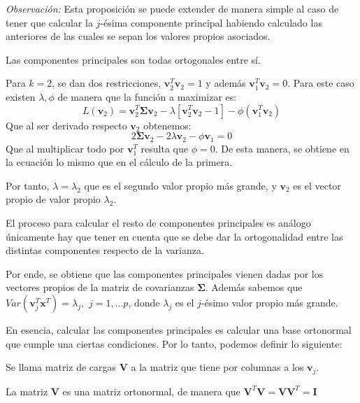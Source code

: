 \noindent \emph{Observación: } Esta proposición se puede extender de manera simple al caso de tener que calcular la $j$-ésima componente principal habiendo calculado las anteriores de las cuales se sepan los valores propios asociados. 

\begin{coro}
Las componentes principales son todas ortogonales entre sí. 
\end{coro}

\noindent Para $k=2$, se dan dos restricciones, $\textbf{v}_2^T\textbf{v}_2=1$ y además $\textbf{v}_1^T \textbf{v}_2=0$. Para este caso existen $\lambda, \phi$ de manera que la función a maximizar es:
\begin{equation}
 L(\textbf{v}_2)=\textbf{v}_2^T \mathbf{\Sigma} \textbf{v}_2 - \lambda[\textbf{v}_2^T \textbf{v}_2-1]-\phi(\textbf{v}_1^T \textbf{v}_2)
\end{equation}
Que al ser derivado respecto $\textbf{v}_2$ obtenemos:
\begin{equation}
2\mathbf{\Sigma} \textbf{v}_2 - 2\lambda\textbf{v}_2-\phi \textbf{v}_1=0
\end{equation}
Que al multiplicar todo por $\textbf{v}_1^T$ resulta que $\phi=0$. De esta manera, se obtiene en la ecuación lo mismo que en el cálculo de la primera. 

\noindent Por tanto, $\lambda=\lambda_2$ que es el segundo valor propio más grande, y $\textbf{v}_2$ es el vector propio de valor propio $\lambda_2$.

\noindent El proceso para calcular el resto de componentes principales es análogo únicamente hay que tener en cuenta que se debe dar la ortogonalidad entre las distintas componentes respecto de la varianza. 

\noindent Por ende, se obtiene que las componentes principales vienen dadas por los vectores propios de la matriz de covarianzas $\mathbf{\Sigma} $. Además sabemos que $Var(\mathbf{v}_j^T \mathbf{x}^T)=\lambda_j,$ $ j=1,\ldots p$, donde $\lambda_j$ es el $j$-ésimo valor propio más grande. 

\noindent En esencia, calcular las componentes principales es calcular una base ortonormal que cumple una ciertas condiciones. Por lo tanto, podemos definir lo siguiente: 
\begin{defi}
Se llama matriz de cargas $\mathbf{V}$ a la matriz que tiene por columnas a los $\mathbf{v}_j$.
\end{defi}

\begin{propo}
La matriz $\mathbf{V}$ es una matriz ortonormal, de manera que $\mathbf{V}^T\mathbf{V}=\mathbf{V}\mathbf{V}^T=\mathbf{I}$
\end{propo}

